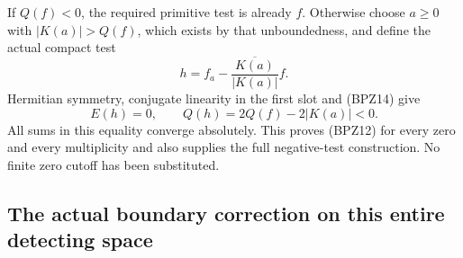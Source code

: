 If $Q(f)<0$, the required primitive test is already $f$.
Otherwise choose $a\ge0$ with $|K(a)|>Q(f)$, which exists by that
unboundedness, and define the actual compact test
\begin{equation}\tag{BPZ16}
 h=f_a-\frac{\overline{K(a)}}{|K(a)|}f.
\end{equation}
Hermitian symmetry, conjugate linearity in the first slot and
(BPZ14) give
\begin{equation}\tag{BPZ17}
 E(h)=0,\qquad Q(h)=2Q(f)-2|K(a)|<0.
\end{equation}
All sums in this equality converge absolutely. This proves (BPZ12)
for every zero and every multiplicity and also supplies the full
negative-test construction. No finite zero cutoff has been substituted.

\subsection{The actual boundary correction on this entire detecting space}

